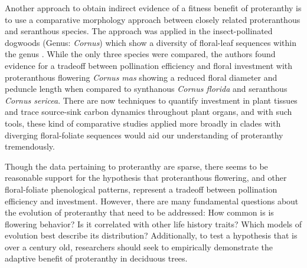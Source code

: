 \documentclass{article}\usepackage[]{graphicx}\usepackage[]{color}
\begin{document}
\par Another approach to obtain indirect evidence of a fitness benefit of proteranthy is to use a comparative morphology approach between closely related proteranthous and seranthous species. The approach was applied in the insect-pollinated dogwoods (Genus: \textit{Cornus}) which show a diversity of floral-leaf sequences within the genus \citep{Gunatilleke1984}. While the only three species were compared, the authors found evidence for a tradeoff between pollination efficiency and floral investment with proteranthous flowering \textit{Cornus mas} showing a reduced floral diameter and peduncle length when compared to synthanous \textit{Cornus florida} and seranthous \textit{Cornus sericea}. There are now techniques to quantify investment in plant tissues and trace source-sink carbon dynamics throughout plant organs, and with such tools, these kind of comparative studies applied more broadly in clades with diverging floral-foliate sequences would aid our understanding of proteranthy tremendously.
\par Though the data pertaining to proteranthy are sparse, there seems to be reasonable support for the hypothesis that proteranthous flowering, and other floral-foliate phenological patterns, represent a tradeoff between pollination efficiency and investment. However, there are many fundamental questions about the evolution of proteranthy that need to be addressed: How common is is flowering behavior? Is it correlated with other life history traits? Which models of evolution best describe its distribution? Additionally, to test a hypothesis that is over a century old, researchers should seek to empirically demonstrate the adaptive benefit of proteranthy in deciduous trees.
\end{document}
